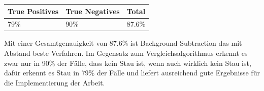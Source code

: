 \begin{center}
\scriptsize
    \begin{tabular}{ | l | l | l |}
    \hline
		True Positives & True Negatives & Total \\ \hline
    79\% &
		90\% &
		87.6\% \\
    \hline
    \end{tabular}
\end{center}

Mit einer Gesamtgenauigkeit von 87.6\% ist Background-Subtraction das mit Abstand beste Verfahren. Im Gegensatz zum Vergleichsalgorithmus erkennt es zwar nur in 90\% der Fälle, dass kein Stau ist, wenn auch wirklich kein Stau ist, dafür erkennt es Stau in 79\% der Fälle und liefert ausreichend gute Ergebnisse für die Implementierung der Arbeit.
